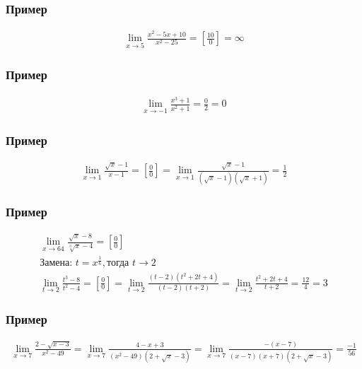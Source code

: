 \documentclass{article}
\begin{document}
\subsubsection{Пример}
\begin{gather*}
    \lim_{x \to 5} \frac{x^2 - 5x + 10}{x^2 - 25} =
    \left[ \frac{10}{0} \right] = \infty
\end{gather*}

\subsubsection{Пример}
\begin{gather*}
    \lim_{x \to -1} \frac{x^3 + 1}{x^2 + 1} = \frac{0}{2} = 0
\end{gather*}

\subsubsection{Пример}
\begin{gather*}
    \lim_{x \to 1} \frac{\sqrt{x} - 1}{x - 1} = 
    \left[ \frac{0}{0} \right] =
    \lim_{x \to 1} \frac{\sqrt{x} - 1}{(\sqrt{x} - 1)(\sqrt{x} + 1)} = \frac{1}{2}
\end{gather*}

\subsubsection{Пример}
\begin{gather*}
    \lim_{x \to 64} \frac{\sqrt{x} - 8}{\sqrt[3]{x} - 4} =
    \left[ \frac{0}{0} \right] \\
    \text{Замена: } t = x^{\frac{1}{6}}, \text{тогда } t \to 2 \\
    \lim_{t \to 2} \frac{t^3 - 8}{t^2 - 4} = 
    \left[ \frac{0}{0} \right] =
    \lim_{t \to 2} \frac{(t - 2)(t^2 + 2t + 4)}{(t - 2)(t + 2)} =
    \lim_{t \to 2} \frac{t^2 + 2t + 4}{t + 2} =
    \frac{12}{4} = 3
\end{gather*}

\subsubsection{Пример}
\begin{gather*}
    \lim_{x \to 7} \frac{2 - \sqrt{x - 3}}{x^2 - 49} =
    \lim_{x \to 7} \frac{4 - x + 3}{(x^2 - 49)(2 + \sqrt{x} - 3)} =
    \lim_{x \to 7} \frac{-(x - 7)}{(x - 7)(x + 7)(2 + \sqrt{x} - 3)} = \frac{-1}{56}
\end{gather*}
\end{document}

